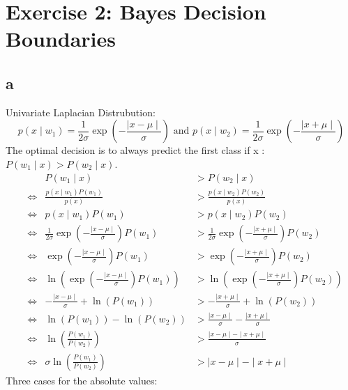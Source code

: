 \section{Exercise 2: Bayes Decision Boundaries}
\subsection{a}
Univariate Laplacian Distrubution:
$$p(x\mid w_1) = \frac{1}{2\sigma}\exp\left(-\frac{\mid x - \mu \mid}{\sigma}\right) \textrm{ and } p(x\mid w_2) = \frac{1}{2\sigma}\exp\left(-\frac{\mid x + \mu \mid}{\sigma}\right)$$
The optimal decision is to always predict the first class if \forall x \in {}:   $P(w_1\mid x) > P(w_2 \mid x)$.
\begin{align*}
&& P(w_1 \mid x) &> P(w_2 \mid x) \\
&\Leftrightarrow &\frac{p(x \mid w_1)P(w_1)}{p(x)} &> \frac{p(x \mid w_2)P(w_2)}{p(x)} \\
&\Leftrightarrow &p(x\mid w_1)P(w_1) &> p(x \mid w_2)P(w_2) \\
&\Leftrightarrow &\frac{1}{2\sigma}\exp\left(-\frac{\mid x - \mu \mid}{\sigma}\right)P(w_1) &> \frac{1}{2\sigma}\exp\left(-\frac{\mid x + \mu \mid}{\sigma}\right)P(w_2) \\
&\Leftrightarrow &\exp\left(-\frac{\mid x - \mu \mid}{\sigma}\right)P(w_1) &> \exp\left(-\frac{\mid x + \mu \mid}{\sigma}\right)P(w_2) \\
&\Leftrightarrow &\ln(\exp\left(-\frac{\mid x - \mu \mid}{\sigma}\right)P(w_1)) &> \ln(\exp\left(-\frac{\mid x + \mu \mid}{\sigma}\right)P(w_2)) \\
&\Leftrightarrow &-\frac{\mid x - \mu \mid}{\sigma} + \ln(P(w_1)) &> -\frac{\mid x + \mu \mid}{\sigma} + \ln(P(w_2)) \\
&\Leftrightarrow & \ln(P(w_1)) - \ln(P(w_2)) &> \frac{\mid x - \mu \mid}{\sigma} - \frac{\mid x + \mu \mid}{\sigma} \\
&\Leftrightarrow & \ln\left(\frac{P(w_1)}{P(w_2)}\right) &> \frac{\mid x - \mu \mid - \mid x + \mu \mid}{\sigma} \\
&\Leftrightarrow & \sigma\ln\left(\frac{P(w_1)}{P(w_2)}\right) &> \mid x - \mu \mid - \mid x + \mu \mid
\end{align*}
Three cases for the absolute values:
